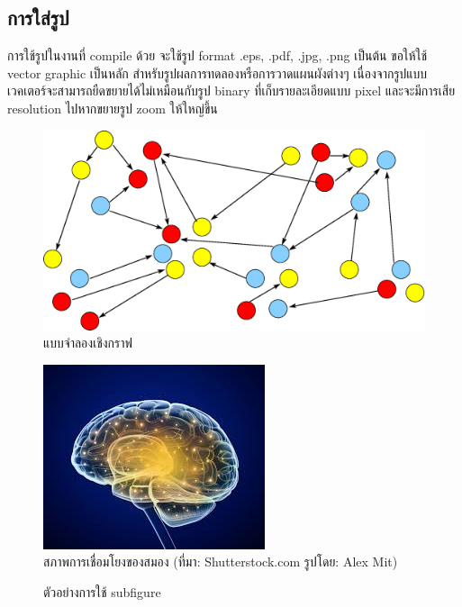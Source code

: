 \documentclass[11pt,a4paper]{article}
\begin{document}
\subsection{การใส่รูป}
การใช้รูปในงานที่ compile ด้วย \XeLaTeX จะใช้รูป format .eps, .pdf, .jpg, .png เป็นต้น ขอให้ใช้ vector graphic เป็นหลัก สำหรับรูปผลการทดลองหรือการวาดแผนผังต่างๆ เนื่องจากรูปแบบเวคเตอร์จะสามารถยืดขยายได้ไม่เหมือนกับรูป binary ที่เก็บรายละเอียดแบบ pixel และจะมีการเสีย resolution ไปหากขยายรูป zoom ให้ใหญ่ขึ้น
\begin{figure}[ht]
    \begin{center}
        \includegraphics[width=0.7\linewidth]{gm.eps}
        \caption{แบบจำลองเชิงกราฟ}
    \end{center}
\end{figure}

\begin{figure}[h!]
    \begin{center}
        \includegraphics[width=0.5\linewidth]{brain.jpg}
        \caption{สภาพการเชื่อมโยงของสมอง (ที่มา: Shutterstock.com รูปโดย: Alex Mit)}
    \end{center}
\end{figure}

\begin{figure}
    \centering
    \caption{ตัวอย่างการใช้ subfigure}
\end{figure}
\end{document}
